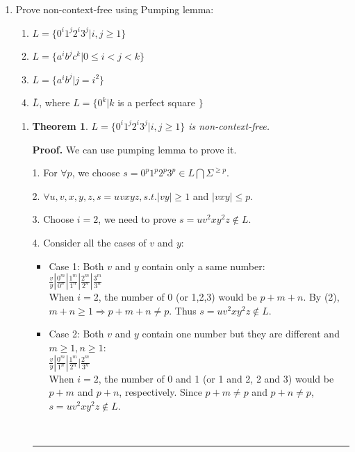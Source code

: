 \documentclass{article}%
\newtheorem{theorem}{Theorem}
\newenvironment{proof}[1][Proof]{\textbf{#1.} }{\ \rule{0.5em}{0.5em}}
\begin{document}
\begin{enumerate}

	\item Prove non-context-free using Pumping lemma:
	\begin{enumerate}
		\item $ L = \{ 0^i 1^j 2^i 3^j |i,j \ge 1\} $
		\item $ L = \{ a^i b^j c^k |0 \le i < j < k\} $
		\item $ L = \{ a^i b^j |j = i^2 \} $
		\item $ {\bar L}$, where $L = \{ 0^k |k$  is a perfect square $\}$
	\end{enumerate}
	
  
\begin{enumerate}
	\item 
	\begin{theorem}
	$ L = \{ 0^i 1^j 2^i 3^j |i,j \ge 1\} $ is non-context-free.
	\end{theorem}
	\begin{proof}
	We can use pumping lemma to prove it.
	
  1. For $\forall p$, we choose $s = 0^p 1^p 2^p 3^p \in L \bigcap \Sigma ^{\geq p}$. 
  
  2. $\forall u,v,x,y,z, s = uvxyz, s.t. |vy| \geq 1$ and $|vxy| \leq p$.
  
  3. Choose $i = 2$, we need to prove $s = uv^2xy^2z \notin L$.
  
  4. Consider all the cases of $v$ and $y$:
  
\begin{itemize}
	\item Case 1: Both $v$ and $y$ contain only a same number: \\
	
	$\frac{v}{y} | \frac{0^m}{0^n}| \frac{1^m}{1^n}| \frac{2^m}{2^n}| \frac{3^m}{3^n}$\\
	
	When $i = 2$, the number of 0 (or 1,2,3) would be $p+m+n$. By (2), $m+n \geq 1 \Rightarrow p+m+n \neq p$. Thus $s = uv^2xy^2z \notin L$. \\
	
	\item Case 2: Both $v$ and $y$ contain one number but they are different and $m \geq 1, n \geq 1$: \\
	
	$\frac{v}{y} | \frac{0^m}{1^n}| \frac{1^m}{2^n}| \frac{2^m}{3^n}$\\
	
	When $i = 2$, the number of 0 and 1 (or 1 and 2, 2 and 3) would be $p+m$ and $p+n$, respectively. Since $p+m \neq p $ and $p+n \neq p$, $s = uv^2xy^2z \notin L$.\\
	

\end{itemize}
\end{proof}
\end{enumerate}
\end{enumerate}
\end{document}
